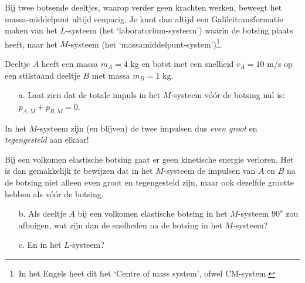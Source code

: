 Bij  twee  botsende  deeltjes,  waarop verder geen krachten werken, beweegt 
het massa-middelpunt altijd eenparig.
Je  kunt  dan altijd een Galileitransformatie maken van het 
$L$-systeem (het `laboratorium-systeem') waarin de botsing plaats heeft, 
naar het 
$M$-systeem (het `massamiddelpunt-system')\footnote{In het Engels heet dit het `Centre of mass system', ofwel CM-system.}.

Deeltje $A$ heeft een massa $m_{A} = 4$ kg en botst met een snelheid
$v_{A} = 10 $ m/s op een stilstaand 
deeltje $B$  met massa $m_{B} = 1 $ kg. 
\begin{itemize}
\item [a.]
Laat zien dat de totale impuls in het $M$-systeem
v\'{o}\'{o}r  de  botsing nul is:
$p_{A,M} + p_{B,M} = 0$. 
\end{itemize}

In het $M$-systeem zijn (en blijven) de twee impulsen dus {\it even groot} en 
{\it tegengesteld} aan elkaar!

Bij  een  volkomen  elastische  botsing  gaat  er  geen kinetische energie 
verloren.
Het is dan gemakkelijk  te  bewijzen  dat  in het $M$-systeem de impulsen van 
$A$ en $B$ na de botsing niet alleen even groot en tegengesteld zijn, maar 
ook dezelfde grootte hebben als v\'{o}\'{o}r de botsing.
\begin{itemize}
\item [b.]
Als deeltje $A$ bij een volkomen elastische botsing in het $M$-systeem 
$90^{o}$ zou afbuigen, wat zijn dan de snelheden na de botsing 
in het $M$-systeem? 
\item[c.] En in het $L$-systeem? 
\end{itemize}




 